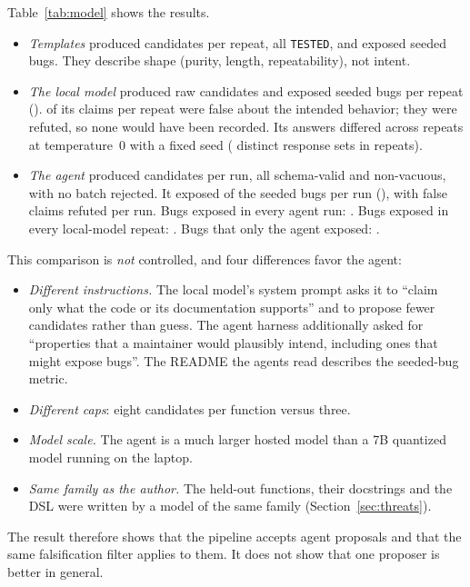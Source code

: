 \documentclass[10pt,twocolumn]{article}
\newcommand{\res}[1]{\texttt{\small #1}}
\begin{document}
Table~\ref{tab:model} shows the results.
\begin{itemize}
\item \emph{Templates} produced \TemplateRawCands{} candidates per repeat, all \res{TESTED}, and exposed
  \TemplateExposed{} seeded bugs. They describe shape (purity, length, repeatability), not intent.
\item \emph{The local model} produced \ModelRawCands{} raw candidates and exposed \ModelExposed{} seeded bugs per repeat
  (\ModelExposedFns). \ModelFalseClaims{} of its claims per repeat were false about the intended behavior; they were
  refuted, so none would have been recorded. Its answers differed across repeats at temperature~0 with a fixed seed
  (\ModelDistinctResponseSets{} distinct response sets in \ModelRepeats{} repeats).
\item \emph{The agent} produced \AgentRawCands{} candidates per run, all schema-valid and non-vacuous, with no batch
  rejected. It exposed \AgentExposed{} of the \ModelSeeded{} seeded bugs per run (\AgentExposedFns), with
  \AgentFalseClaims{} false claims refuted per run. Bugs exposed in every agent run: \ExposedEveryAgentRun. Bugs exposed
  in every local-model repeat: \ExposedEveryModelRun. Bugs that only the agent exposed: \ExposedOnlyAgent.
\end{itemize}

This comparison is \emph{not} controlled, and four differences favor the agent:
\begin{itemize}
\item \emph{Different instructions.} The local model's system prompt asks it to ``claim only what the code or its
  documentation supports'' and to propose fewer candidates rather than guess. The agent harness additionally asked for
  ``properties that a maintainer would plausibly intend, including ones that might expose bugs''. The README the agents
  read describes the seeded-bug metric.
\item \emph{Different caps}: eight candidates per function versus three.
\item \emph{Model scale.} The agent is a much larger hosted model than a 7B quantized model running on the laptop.
\item \emph{Same family as the author.} The held-out functions, their docstrings and the DSL were written by a model of
  the same family (Section~\ref{sec:threats}).
\end{itemize}
The result therefore shows that the pipeline accepts agent proposals and that the same falsification filter applies to
them. It does not show that one proposer is better in general.
\end{document}
